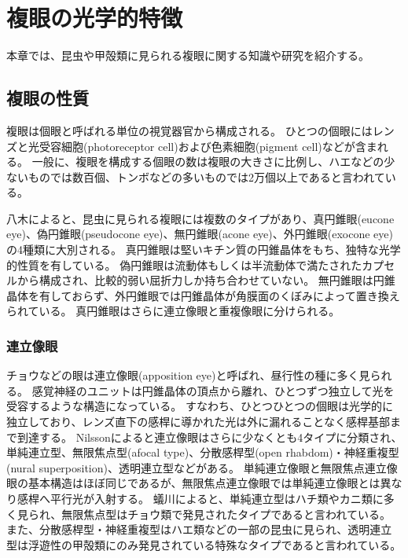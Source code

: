 \chapter{複眼の光学的特徴}
\label{CKnowledge}

本章では、昆虫や甲殻類に見られる複眼に関する知識や研究を紹介する。

\section{複眼の性質}

複眼は個眼と呼ばれる単位の視覚器官から構成される\figref{}。
ひとつの個眼にはレンズと光受容細胞(photoreceptor cell)および色素細胞(pigment cell)などが含まれる。
一般に、複眼を構成する個眼の数は複眼の大きさに比例し、ハエなどの少ないものでは数百個、トンボなどの多いものでは2万個以上であると言われている\cite{arikawa-zougan}。

八木\cite{yagi1951studies}によると、昆虫に見られる複眼には複数のタイプがあり、真円錐眼(eucone eye)、偽円錐眼(pseudocone eye)、無円錐眼(acone eye)、外円錐眼(exocone eye)の4種類に大別される。
真円錐眼は堅いキチン質の円錐晶体をもち、独特な光学的性質を有している。
偽円錐眼は流動体もしくは半流動体で満たされたカプセルから構成され、比較的弱い屈折力しか持ち合わせていない。
無円錐眼は円錐晶体を有しておらず、外円錐眼では円錐晶体が角膜面のくぼみによって置き換えられている。
真円錐眼はさらに連立像眼と重複像眼に分けられる。

\subsection{連立像眼}

チョウなどの眼は連立像眼(apposition eye)と呼ばれ、昼行性の種に多く見られる。
感覚神経のユニットは円錐晶体の頂点から離れ、ひとつずつ独立して光を受容するような構造になっている\cite{arikawa-zougan}。
すなわち、ひとつひとつの個眼は光学的に独立しており、レンズ直下の感桿に導かれた光は外に漏れることなく感桿基部まで到達する。
Nilsson\cite{}によると連立像眼はさらに少なくとも4タイプに分類され、単純連立型、無限焦点型(afocal type)、分散感桿型(open rhabdom)・神経重複型(nural superposition)、透明連立型などがある。
単純連立像眼と無限焦点連立像眼の基本構造はほぼ同じであるが、無限焦点連立像眼では単純連立像眼とは異なり感桿へ平行光が入射する。
蟻川\cite{}によると、単純連立型はハチ類やカニ類に多く見られ、無限焦点型はチョウ類で発見されたタイプであると言われている。
また、分散感桿型・神経重複型はハエ類などの一部の昆虫に見られ、透明連立型は浮遊性の甲殻類にのみ発見されている特殊なタイプであると言われている。

